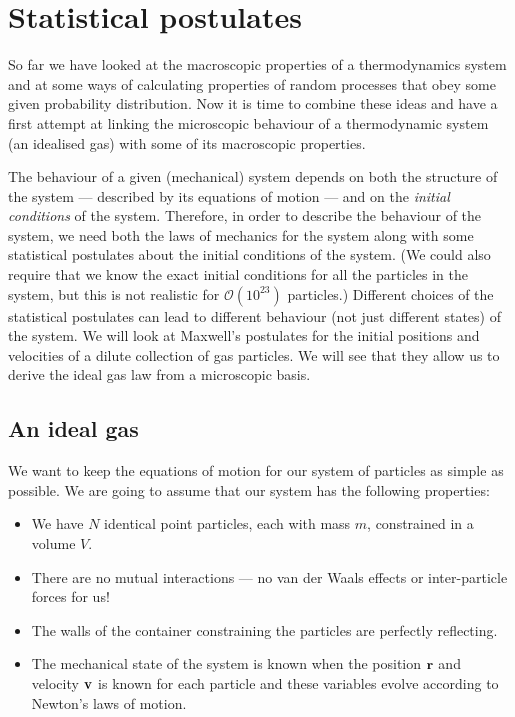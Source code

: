 \section{Statistical postulates}
So far we have looked at the macroscopic properties of a thermodynamics system and at some ways of calculating properties of random processes that obey some given probability distribution. Now it is time to combine these ideas and have a first attempt at linking the microscopic behaviour of a thermodynamic system (an idealised gas) with some of its macroscopic properties.

The behaviour of a given (mechanical) system depends on both the structure of the system --- described by its equations of motion --- and on the \emph{initial conditions} of the system. Therefore, in order to describe the behaviour of the system, we need both the laws of mechanics for the system along with some statistical postulates about the initial conditions of the system. (We could also require that we know the exact initial conditions for all the particles in the system, but this is not realistic for $\mathcal{O}(10^{23})$ particles.) Different choices of the statistical postulates can lead to different behaviour (not just different states) of the system. We will look at Maxwell's postulates for the initial positions and velocities of a dilute collection of gas particles. We will see that they allow us to derive the ideal gas law from a microscopic basis.

\subsection{An ideal gas}
We want to keep the equations of motion for our system of particles as simple as possible. We are going to assume   that our system has the following properties:
\begin{itemize}
\item We have $N$ identical  point particles, each with mass $m$, constrained in a volume $V$.
\item There are no mutual interactions --- no van der Waals effects or inter-particle forces for us!
\item The walls of the container constraining the particles are perfectly reflecting.
\item The mechanical state of the system is known when the position $\bf r$ and velocity $\bf v$ is known for each particle and these variables evolve according to Newton's laws of motion.
\end{itemize}

